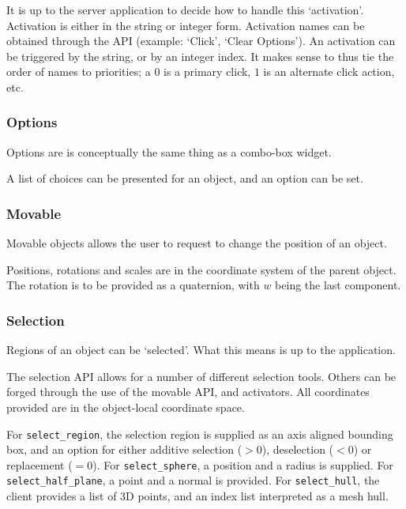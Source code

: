 \documentclass[11pt, oneside]{amsart}
\begin{document}
 It is up to the server application to decide how to handle this `activation'. Activation is either in the string or integer form. Activation names can be obtained through the API (example: `Click', `Clear Options'). An activation can be triggered by the string, or by an integer index. It makes sense to thus tie the order of names to priorities; a $0$ is a primary click, $1$ is an alternate click action, etc.

\subsubsection{Options}

Options are is conceptually the same thing as a combo-box widget.



 A list of choices can be presented for an object, and an option can be set.

\subsubsection{Movable}

Movable objects allows the user to request to change the position of an object.



Positions, rotations and scales are in the coordinate system of the parent object. The rotation is to be provided as a quaternion, with $w$ being the last component.

\subsubsection{Selection}

Regions of an object can be `selected'. What this means is up to the application.



The selection API allows for a number of different selection tools. Others can be forged through the use of the movable API, and activators. All coordinates provided are in the object-local coordinate space.

For \texttt{select\_region}, the selection region is supplied as an axis aligned bounding box, and an option for either additive selection ($> 0$), deselection ($< 0$) or replacement ($= 0$). For \texttt{select\_sphere}, a position and a radius is supplied. For \texttt{select\_half\_plane}, a point and a normal is provided. For \texttt{select\_hull}, the client provides a list of 3D points, and an index list interpreted as a mesh hull.
\end{document}
